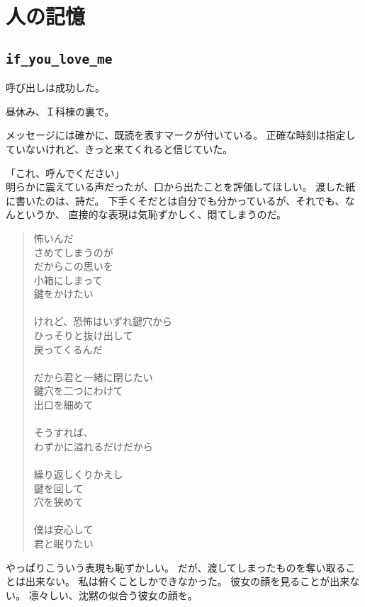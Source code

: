 \documentclass[../IHMain]{subfiles}
\begin{document}
\chapter{人の記憶}
\section*{\tt if\_you\_love\_me}
呼び出しは成功した。

昼休み、Ｉ科棟の裏で。

メッセージには確かに、既読を表すマークが付いている。
正確な時刻は指定していないけれど、きっと来てくれると信じていた。

「これ、呼んでください」\\
明らかに震えている声だったが、口から出たことを評価してほしい。
渡した紙に書いたのは、詩だ。
下手くそだとは自分でも分かっているが、それでも、なんというか、
直接的な表現は気恥ずかしく、悶てしまうのだ。
\begin{verse}
    怖いんだ\\
    さめてしまうのが\\
    だからこの思いを\\
    小箱にしまって\\
    鍵をかけたい\\　\\

    けれど、恐怖はいずれ鍵穴から\\
    ひっそりと抜け出して\\
    戻ってくるんだ\\　\\

    だから君と一緒に閉じたい\\
    鍵穴を二つにわけて\\
    出口を細めて\\　\\

    そうすれば、\\
    わずかに溢れるだけだから\\　\\

    繰り返しくりかえし\\
    鍵を回して\\
    穴を狭めて\\　\\
    
    僕は安心して\\
    君と眠りたい\\
\end{verse}
やっぱりこういう表現も恥ずかしい。
だが、渡してしまったものを奪い取ることは出来ない。
私は俯くことしかできなかった。
彼女の顔を見ることが出来ない。
凛々しい、沈黙の似合う彼女の顔を。
\end{document}
